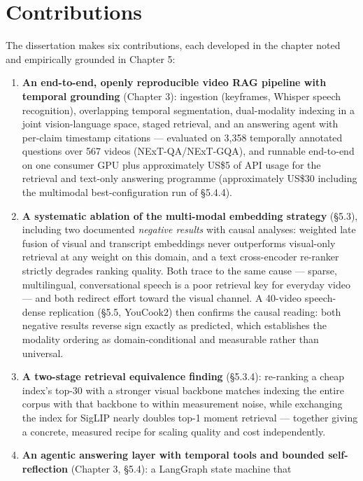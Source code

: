 \section{Contributions}

The dissertation makes six contributions, each developed in the chapter
noted and empirically grounded in Chapter 5:

\begin{enumerate}
\def\labelenumi{\arabic{enumi}.}
\item
  \textbf{An end-to-end, openly reproducible video RAG pipeline with
  temporal grounding} (Chapter 3): ingestion (keyframes, Whisper speech
  recognition), overlapping temporal segmentation, dual-modality
  indexing in a joint vision-language space, staged retrieval, and an
  answering agent with per-claim timestamp citations --- evaluated on
  3,358 temporally annotated questions over 567 videos
  (NExT-QA/NExT-GQA), and runnable end-to-end on one consumer GPU plus
  approximately US\$5 of API usage for the retrieval and text-only
  answering programme (approximately US\$30 including the multimodal
  best-configuration run of §5.4.4).
\item
  \textbf{A systematic ablation of the multi-modal embedding strategy}
  (§5.3), including two documented \emph{negative results} with causal
  analyses: weighted late fusion of visual and transcript embeddings
  never outperforms visual-only retrieval at any weight on this domain,
  and a text cross-encoder re-ranker strictly degrades ranking quality.
  Both trace to the same cause --- sparse, multilingual, conversational
  speech is a poor retrieval key for everyday video --- and both
  redirect effort toward the visual channel. A 40-video speech-dense
  replication (§5.5, YouCook2) then confirms the causal reading: both
  negative results reverse sign exactly as predicted, which establishes
  the modality ordering as domain-conditional and measurable rather than
  universal.
\item
  \textbf{A two-stage retrieval equivalence finding} (§5.3.4):
  re-ranking a cheap index's top-30 with a stronger visual backbone
  matches indexing the entire corpus with that backbone to within
  measurement noise, while exchanging the index for SigLIP nearly
  doubles top-1 moment retrieval --- together giving a concrete,
  measured recipe for scaling quality and cost independently.
\item
  \textbf{An agentic answering layer with temporal tools and bounded
  self-reflection} (Chapter 3, §5.4): a LangGraph state machine that

\end{enumerate}
